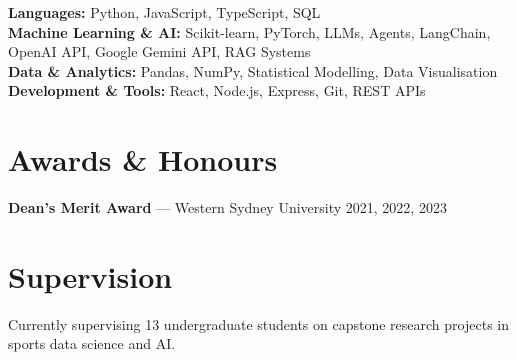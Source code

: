 \documentclass[11pt, a4paper]{article}
\begin{document}
\textbf{Languages:} Python, JavaScript, TypeScript, SQL \\
\textbf{Machine Learning \& AI:} Scikit-learn, PyTorch, LLMs, Agents, LangChain, OpenAI API, Google Gemini API, RAG Systems \\
\textbf{Data \& Analytics:} Pandas, NumPy, Statistical Modelling, Data Visualisation \\
\textbf{Development \& Tools:} React, Node.js, Express, Git, REST APIs

\section*{Awards \& Honours}

\textbf{Dean's Merit Award} --- Western Sydney University \hfill 2021, 2022, 2023

\section*{Supervision}

Currently supervising 13 undergraduate students on capstone research projects in sports data science and AI.
\end{document}
